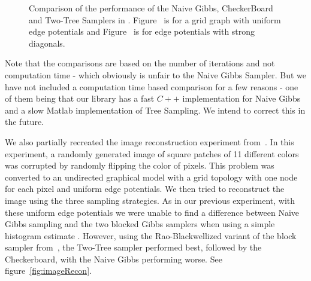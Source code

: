 \documentclass{article} %
\begin{document}
\begin{figure}
\centering
\caption[]{Comparison of the performance of the Naive Gibbs, CheckerBoard and
Two-Tree Samplers in \cite{hamze2004fields}. Figure~ is
for a grid graph with uniform edge potentials and
Figure~ is for edge potentials with strong diagonals.}
\label{fig:gibbsResults}
\end{figure}

Note that the comparisons are based on the number of iterations and not
computation time - which obviously is unfair to the Naive Gibbs Sampler. But
we have not included a computation time based comparison for a few reasons - one
of them being that our library has a fast $C++$ implementation for Naive Gibbs
and a slow Matlab implementation of Tree Sampling. We intend to correct this in
the future.

We also partially recreated the image reconstruction experiment
from~\cite{hamze2004fields}. In this experiment, a randomly generated image of
square patches of 11 different colors was corrupted by randomly flipping the
color of pixels. This problem was converted to an undirected graphical model
with a grid topology with one node for each pixel and uniform edge potentials.
We then tried to reconstruct the image using the three sampling strategies.  As
in our previous experiment, with these uniform edge potentials we were unable
to find a difference between Naive Gibbs sampling and the two blocked Gibbs
samplers when using a simple histogram estimate . However, using the
Rao-Blackwellized variant of the block sampler
from~\cite{hamze2006information}, the Two-Tree sampler performed best, followed
by the Checkerboard, with the Naive Gibbs performing worse. See figure~\ref{fig:imageRecon}.
\end{document}
